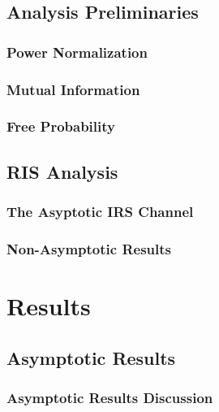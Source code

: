 \documentclass[12pt,a4paper]{report}
\begin{document}
\section{Analysis Preliminaries}
\subsection{Power Normalization}

\subsection{Mutual Information}\label{sectiond:mut_info}

\subsection{Free Probability}\label{Free_Prob_Intro}

\section{RIS Analysis}
\subsection{The Asyptotic IRS Channel}

\subsection{Non-Asymptotic Results}

\chapter{Results}\label{Results}
\section{Asymptotic Results}

\subsection{Asymptotic Results Discussion}
\end{document}
